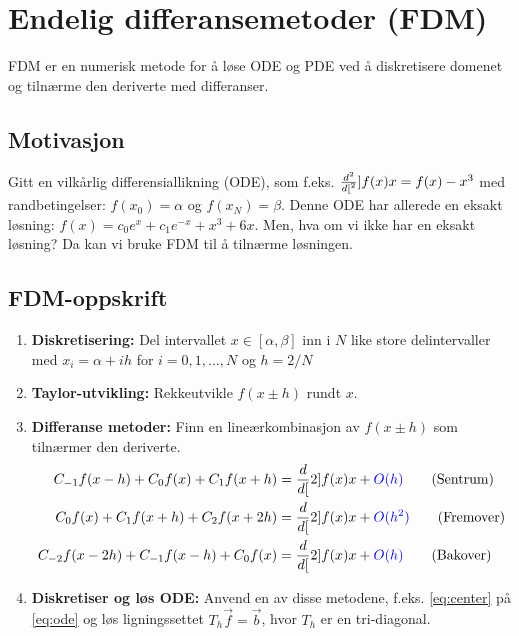 \section{Endelig differansemetoder (FDM)}

FDM er en numerisk metode for å løse ODE og PDE ved å diskretisere domenet og tilnærme den deriverte med differanser.

\subsection*{Motivasjon}

Gitt en vilkårlig differensiallikning (ODE), som f.eks. \( \frac{d^{2}}{d{[}^{2}}]{f(x)}{x} = f(x) - x^3 \)\label{eq:ode} med randbetingelser: \( f(x_0) = \alpha \) og \( f(x_N) = \beta \).
Denne ODE har allerede en eksakt løsning: \( f(x) = c_0e^x + c_1e^{-x} + x^3 + 6x \)\label{eq:exact}.
Men, hva om vi ikke har en eksakt løsning? Da kan vi bruke FDM til å tilnærme løsningen.

\subsection*{FDM-oppskrift}

\begin{enumerate}
    \item \textbf{Diskretisering:} Del intervallet \(x \in [\alpha, \beta]\) inn i \(N\) like store delintervaller med \(x_i = \alpha + ih\) for \(i = 0,1,\ldots,N\) og \(h = 2/N\)
    \item \textbf{Taylor-utvikling:} Rekkeutvikle \(f(x \pm h)\) rundt \(x\).
    \item \textbf{Differanse metoder:} Finn en lineærkombinasjon av \(f(x \pm h)\) som tilnærmer den deriverte.
          \begin{align}
              C_{-1}f(x - h) + C_0f(x) + C_1f(x + h)   & = \dd[2]{f(x)}{x} + \mathcolor{blue}{O(h)} \tag{Sentrum} \label{eq:center}     \\
              C_{0}f(x) + C_1f(x + h ) + C_2f(x + 2h)  & = \dd[2]{f(x)}{x} + \mathcolor{blue}{O(h^2)} \tag{Fremover} \label{eq:forward} \\
              C_{-2}f(x - 2h) + C_{-1}f(x-h) + C_0f(x) & = \dd[2]{f(x)}{x} + \mathcolor{blue}{O(h)} \tag{Bakover} \label{eq:backward}
          \end{align}
    \item \textbf{Diskretiser og løs ODE:} Anvend en av disse metodene, f.eks. \ref{eq:center} på \ref{eq:ode} og løs ligningssettet \(T_h \vec{f} = \vec{b}\), hvor \(T_h\) er en tri-diagonal.
\end{enumerate}

